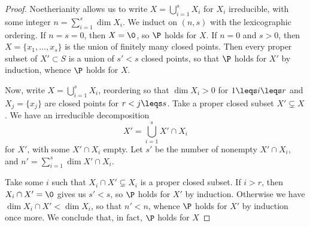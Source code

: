 \documentclass[12pt]{amsart}
\begin{document}
\begin{proof}
  Noetherianity allows us to write $X=\bigcup_{i=1}^s X_i$ for $X_i$ irreducible, with some integer $n=\sum_{i=1}^s \dim X_i$.
  We induct on $(n,s)$ with the lexicographic ordering.
  If $n=s=0$, then $X=\0$, so $\P$ holds for $X$.
  If $n=0$ and $s>0$, then $X = \{x_1,\ldots, x_s\}$ is the union of finitely many closed points.
  Then every proper subset of $X'\subset S$ is a union of $s'<s$ closed points, so that $\P$ holds for $X'$ by induction, whence $\P$ holds for $X$.

  Now, write $X = \bigcup_{i=1}^s X_i$, reordering so that $\dim X_i>0$ for $1\leqs i\leqs r$ and $X_j = \{x_j\}$ are closed points for $r<j\leqs s$.
  Take a proper closed subset $X'\subsetneq X$.
  We have an irreducible decomposition
  \[
    X' = \bigcup_{i=1}^{s} X'\cap X_i
  \] 
  for $X'$, with some $X'\cap X_i$ empty.
  Let $s'$ be the number of nonempty $X'\cap X_i$, and $n'=\sum_{i=1}^s \dim X'\cap X_i$.

  Take some $i$ such that $X_i\cap X'\subsetneq X_i$ is a proper closed subset.
  If $i>r$, then $X_i\cap X'=\0$ gives us $s'<s$, so $\P$ holds for $X'$ by induction.
  Otherwise we have $\dim X_i\cap X'<\dim X_i$, so that $n'<n$, whence $\P$ holds for $X'$ by induction once more.
  We conclude that, in fact, $\P$ holds for $X$
\end{proof}

% 
\end{document}
